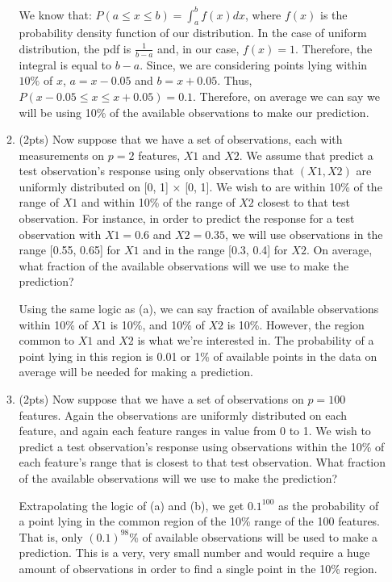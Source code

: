 \documentclass[a4paper]{article}
\theoremstyle{definition}
\newenvironment{soln}{
    \leavevmode\color{blue}\ignorespaces
}{}
\begin{document}
\begin{enumerate}
\begin{enumerate}
	\begin{soln}  We know that: $ P(a \leq x \leq b) = \int_a^b f(x) dx$, where $f(x)$ is the probability density function of our distribution. In the case of uniform distribution, the pdf is $\frac{1}{b-a}$ and, in our case, $f(x)=1$. Therefore, the integral is equal to $b-a$. Since, we are considering points lying within $10\%$ of $x$, $a=x-0.05$ and $b=x+0.05$. Thus, $ P(x-0.05 \leq x \leq x+0.05)=0.1$. Therefore, on average we can say we will be using 10\% of the available observations to make our prediction. 
    \end{soln}
	
	
	\item (2pts) Now suppose that we have a set of observations, each with measurements on $p =2$ features, $X1$ and $X2$. We assume that predict a test observation’s response using only observations that $(X1,X2)$ are uniformly distributed on [0, 1] × [0, 1]. We wish to are within 10\% of the range of $X1$ and within 10\% of the range of $X2$ closest to that test observation. For instance, in order to predict the response for a test observation with $X1 =0.6$ and $X2 =0.35$, we will use observations in the range [0.55, 0.65] for $X1$ and in the range [0.3, 0.4] for $X2$. On average, what fraction of the available observations will we use to make the prediction?
	
	\begin{soln}  Using the same logic as (a), we can say fraction of available observations within 10\% of $X1$ is 10\%, and  10\% of $X2$ is 10\%. However, the region common to $X1$ and $X2$ is what we're interested in. The probability of a point lying in this region is 0.01 or 1\% of available points in the data on average will be needed for making a prediction.\end{soln}
	
	\item (2pts) Now suppose that we have a set of observations on $p = 100$ features. Again the observations are uniformly distributed on each feature, and again each feature ranges in value from 0 to 1. We wish to predict a test observation’s response using observations within the 10\% of each feature’s range that is closest to that test observation. What fraction of the available observations will we use to make the prediction?
	
	\begin{soln}  Extrapolating the logic of (a) and (b), we get $0.1^{100}$ as the probability of a point lying in the common region of the 10\% range of the 100 features. That is, only $(0.1)^{98}$\% of available observations will be used to make a prediction. This is a very, very small number and would require a huge amount of observations in order to find a single point in the 10\% region. \end{soln}
	

\end{enumerate}
\end{enumerate}
\end{document}
